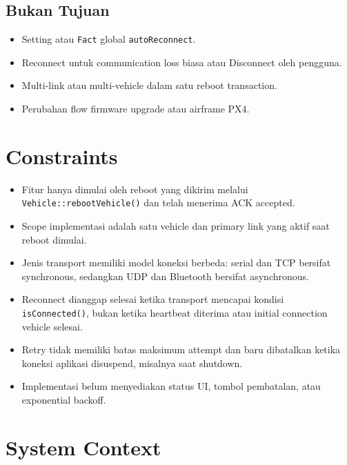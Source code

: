 \documentclass[11pt,a4paper]{article}
\begin{document}
\subsection*{Bukan Tujuan}

\begin{itemize}[itemsep=0.25em,topsep=0.25em]
    \item Setting atau \texttt{Fact} global \texttt{autoReconnect}.
    \item Reconnect untuk communication loss biasa atau Disconnect oleh pengguna.
    \item Multi-link atau multi-vehicle dalam satu reboot transaction.
    \item Perubahan flow firmware upgrade atau airframe PX4.
\end{itemize}

\section{Constraints}

\begin{itemize}
    \item Fitur hanya dimulai oleh reboot yang dikirim melalui
          \texttt{Vehicle::rebootVehicle()} dan telah menerima ACK accepted.
    \item Scope implementasi adalah satu vehicle dan primary link yang aktif saat
          reboot dimulai.
    \item Jenis transport memiliki model koneksi berbeda: serial dan TCP bersifat
          synchronous, sedangkan UDP dan Bluetooth bersifat asynchronous.
    \item Reconnect dianggap selesai ketika transport mencapai kondisi
          \texttt{isConnected()}, bukan ketika heartbeat diterima atau initial
          connection vehicle selesai.
    \item Retry tidak memiliki batas maksimum attempt dan baru dibatalkan ketika
          koneksi aplikasi disuspend, misalnya saat shutdown.
    \item Implementasi belum menyediakan status UI, tombol pembatalan, atau
          exponential backoff.
\end{itemize}

\section{System Context}
\end{document}
